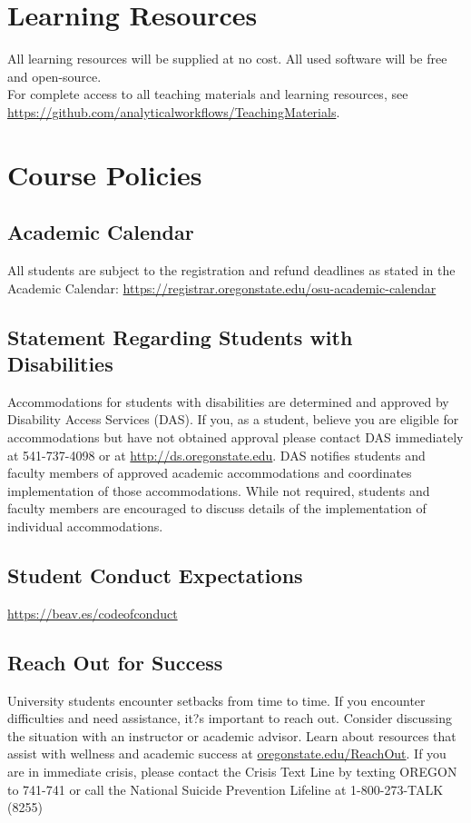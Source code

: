 \documentclass[10pt]{article}
\begin{document}
\section*{Learning Resources}
All learning resources will be supplied at no cost. 
All used software will be free and open-source.\\ 
For complete access to all teaching materials and learning resources, see\\
\url{https://github.com/analyticalworkflows/TeachingMaterials}.

\clearpage

\section*{Course Policies }


\subsection*{Academic Calendar}
All students are subject to the registration and refund deadlines as stated in the Academic Calendar: 
\url{https://registrar.oregonstate.edu/osu-academic-calendar}

\subsection*{Statement Regarding Students with Disabilities}
Accommodations for students with disabilities are determined and approved by Disability Access 
Services (DAS). 
If you, as a student, believe you are eligible for accommodations but have not obtained 
approval please contact DAS immediately at 541-737-4098 or at \url{http://ds.oregonstate.edu}. 
DAS notifies 
students and faculty members of approved academic accommodations and coordinates implementation 
of those accommodations. 
While not required, students and faculty members are encouraged to discuss 
details of the implementation of individual accommodations.

\subsection*{Student Conduct Expectations}
\url{https://beav.es/codeofconduct}

\subsection*{Reach Out for Success}
University students encounter setbacks from time to time. If you encounter difficulties and need 
assistance, it?s important to reach out. Consider discussing the situation with an instructor or academic 
advisor.
 Learn about resources that assist with wellness and academic success at 
\url{oregonstate.edu/ReachOut}.
 If you are in immediate crisis, please contact the Crisis Text Line by texting 
OREGON to 741-741 or call the National Suicide Prevention Lifeline at 1-800-273-TALK (8255)
\end{document}
